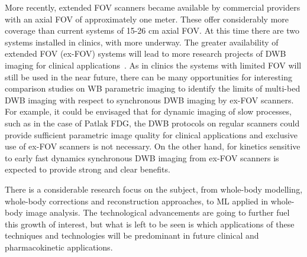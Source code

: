 More recently, extended FOV scanners became available by commercial providers with an axial FOV of approximately one meter. These offer considerably more coverage than current systems of 15-26 cm axial FOV. At this time there are two systems installed in clinics, with more underway. The greater availability of extended FOV (ex-FOV) systems will lead to more research projects of DWB imaging for clinical applications~\cite{Slart2021}. As in clinics the systems with limited FOV will still be used in the near future, there can be many opportunities for interesting comparison studies on WB parametric imaging to identify the limits of multi-bed DWB imaging with respect to synchronous DWB imaging by ex-FOV scanners.
For example, it could be envisaged that for dynamic imaging of slow processes, such as in the case of Patlak FDG, the DWB protocols on regular scanners could provide sufficient parametric image quality for clinical applications and exclusive use of ex-FOV scanners is not necessary. On the other hand, for kinetics sensitive to early fast dynamics synchronous DWB imaging from ex-FOV scanners is expected to provide strong and clear benefits.

There is a considerable research focus on the subject, from whole-body modelling, whole-body corrections and reconstruction approaches, to ML applied in whole-body image analysis. The technological advancements are going to further fuel this growth of interest, but what is left to be seen is which applications of these techniques and technologies will be predominant in future clinical and pharmacokinetic applications.